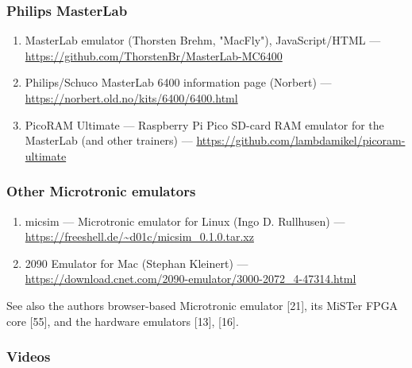 \documentclass[
  11pt,
  letterpaper,
]{article}
\providecommand{\tightlist}{%
  \setlength{\itemsep}{0pt}\setlength{\parskip}{0pt}}
\begin{document}
\subsubsection{Philips MasterLab}\label{philips-masterlab}

\begin{enumerate}
\def\labelenumi{\arabic{enumi}.}
\setcounter{enumi}{31}
\tightlist
\item
  MasterLab emulator (Thorsten Brehm, "MacFly"), JavaScript/HTML ---
  \url{https://github.com/ThorstenBr/MasterLab-MC6400}
\item
  Philips/Schuco MasterLab 6400 information page (Norbert) ---
  \url{https://norbert.old.no/kits/6400/6400.html}
\item
  PicoRAM Ultimate --- Raspberry Pi Pico SD-card RAM emulator for the
  MasterLab (and other trainers) ---
  \url{https://github.com/lambdamikel/picoram-ultimate}
\end{enumerate}

\subsubsection{Other Microtronic
emulators}\label{other-microtronic-emulators}

\begin{enumerate}
\def\labelenumi{\arabic{enumi}.}
\setcounter{enumi}{34}
\tightlist
\item
  micsim --- Microtronic emulator for Linux (Ingo D. Rullhusen) ---
  \url{https://freeshell.de/~d01c/micsim_0.1.0.tar.xz}
\item
  2090 Emulator for Mac (Stephan Kleinert) ---
  \url{https://download.cnet.com/2090-emulator/3000-2072_4-47314.html}
\end{enumerate}

See also the author\textquotesingle s browser-based Microtronic emulator
{[}21{]}, its MiSTer FPGA core {[}55{]}, and the hardware emulators
{[}13{]}, {[}16{]}.

\subsubsection{Videos}\label{videos}
\end{document}
